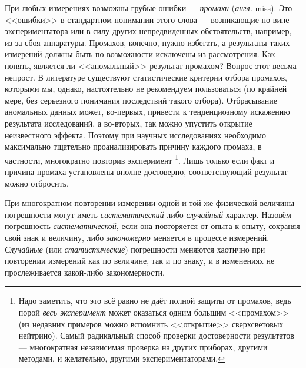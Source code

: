При любых измерениях возможны грубые ошибки --- \emph{промахи}
(\emph{англ.} miss). Это <<ошибки>> в стандартном
понимании этого слова --- возникающие по вине экспериментатора
или в силу других непредвиденных обстоятельств, например, из-за сбоя
аппаратуры. Промахов, конечно, нужно избегать, а результаты таких
измерений должны быть по возможности исключены из рассмотрения. Как
понять, является ли <<аномальный>> результат
промахом? Вопрос этот весьма непрост. В литературе существуют статистические
критерии отбора промахов, которыми мы, однако, настоятельно не рекомендуем
пользоваться (по крайней мере, без серьезного понимания последствий
такого отбора). Отбрасывание аномальных данных может, во-первых, привести
к тенденциозному искажению результата исследований, а во-вторых, так
можно упустить открытие неизвестного эффекта. Поэтому при научных
исследованиях необходимо максимально тщательно проанализировать причину
каждого промаха, в частности, многократно повторив эксперимент \footnote{Надо заметить, что это всё равно не даёт полной защиты от промахов,
ведь порой \emph{весь эксперимент} может оказаться одним большим <<промахом>>
(из недавних примеров можно вспомнить <<открытие>>
сверхсветовых нейтрино). Самый радикальный способ проверки достоверности
результатов --- многократная независимая проверка на других
приборах, другими методами, и желательно, другими экспериментаторами.}. Лишь только если факт и причина промаха установлены вполне достоверно,
соответствующий результат можно отбросить.


При многократном повторении измерении одной и той же физической величины
погрешности могут иметь \emph{систематический} либо \emph{случайный}
характер. Назовём погрешность \emph{систематической}, если она повторяется
от опыта к опыту, сохраняя свой знак и величину, либо \emph{закономерно}
меняется в процессе измерений. \emph{Случайные} (или \emph{статистические})
погрешности меняются хаотично при повторении измерений как по величине,
так и по знаку, и в изменениях не прослеживается какой-либо закономерности.

